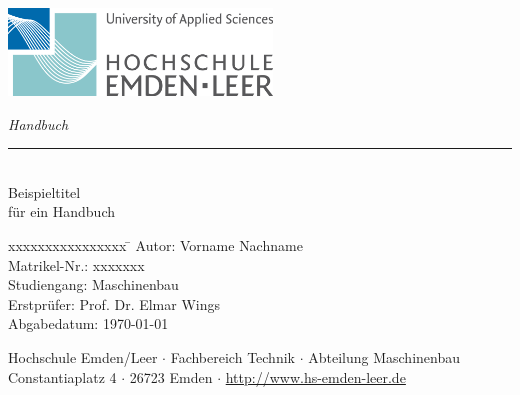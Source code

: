 %
%

\begin{titlepage}
    
    \begin{flushleft} 
        \includegraphics[width=7cm]{General/HS_EmdenLeer_Logo.png}
    \end{flushleft} 
    
    \begin{flushright}
        \vspace{2cm}
        \LARGE \textsl{Handbuch}\\
        \rule{0.6\textwidth}{0.4pt} ~\\
        \vspace{0.5cm}
        \textsf{\LARGE Beispieltitel}\\
        \textsf{\LARGE für ein Handbuch}
    \end{flushright}
    
    \vspace{3cm}
    \large
    \begin{tabbing}
        xxxxxxxxxxxxxxxx \= \kill
        Autor: \> Vorname Nachname \\
        Matrikel-Nr.: \> xxxxxxx \\
        Studiengang: \> Maschinenbau \\ [0.5cm]
        Erstprüfer: \> Prof. Dr. Elmar Wings \\
        Abgabedatum: \> \today \\
    \end{tabbing}
    
    \vspace{3cm}
    \small
    \begin{center}
        Hochschule Emden/Leer $\cdot$ 
        Fachbereich Technik $\cdot$ 
        Abteilung Maschinenbau \\
        Constantiaplatz 4 $\cdot$ 
        26723 Emden $\cdot$ 
        \url{http://www.hs-emden-leer.de}
    \end{center}
    
\end{titlepage}
